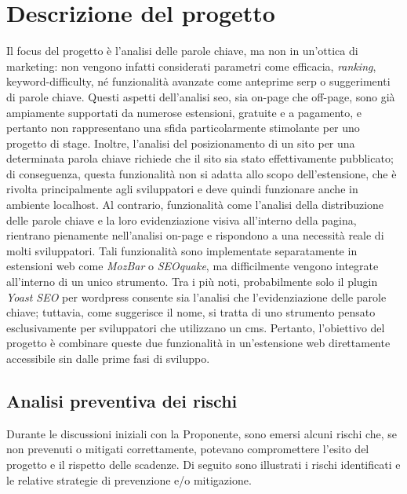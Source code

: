 \chapter{Descrizione del progetto}
\label{cap:descrizione-progetto}

\par Il focus del progetto è l’analisi delle parole chiave, ma non in un’ottica di marketing: non vengono infatti considerati parametri come efficacia, \textit{ranking}, \gls{keyword-difficulty}, né funzionalità avanzate come anteprime \gls{serp} o suggerimenti di parole chiave. Questi aspetti dell’analisi \gls{seo}, sia \gls{on-page} che \gls{off-page}, sono già ampiamente supportati da numerose estensioni, gratuite e a pagamento, e pertanto non rappresentano una sfida particolarmente stimolante per uno progetto di stage. Inoltre, l’analisi del posizionamento di un sito per una determinata parola chiave richiede che il sito sia stato effettivamente pubblicato; di conseguenza, questa funzionalità non si adatta allo scopo dell’estensione, che è rivolta principalmente agli sviluppatori e deve quindi funzionare anche in ambiente \gls{localhost}. Al contrario, funzionalità come l’analisi della distribuzione delle parole chiave e la loro evidenziazione visiva all’interno della pagina, rientrano pienamente nell’analisi \gls{on-page} e rispondono a una necessità reale di molti sviluppatori. Tali funzionalità sono implementate separatamente in estensioni web come \textit{MozBar} o \textit{SEOquake}, ma difficilmente vengono integrate all’interno di un unico strumento. Tra i più noti, probabilmente solo il plugin \textit{Yoast SEO} per \gls{wordpress} consente sia l’analisi che l’evidenziazione delle parole chiave; tuttavia, come suggerisce il nome, si tratta di uno strumento pensato esclusivamente per sviluppatori che utilizzano un \gls{cms}. Pertanto, l’obiettivo del progetto è combinare queste due funzionalità in un’estensione web direttamente accessibile sin dalle prime fasi di sviluppo.

\section{Analisi preventiva dei rischi}
\label{sec:rischi}

\par Durante le discussioni iniziali con la Proponente, sono emersi alcuni rischi che, se non prevenuti o mitigati correttamente, potevano compromettere l’esito del progetto e il rispetto delle scadenze. Di seguito sono illustrati i rischi identificati e le relative strategie di prevenzione e/o mitigazione.

